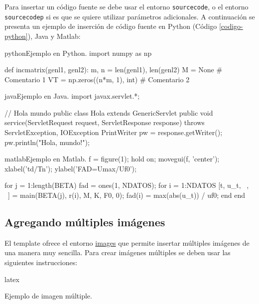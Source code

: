 	Para insertar un código fuente se debe usar el entorno \texttt{sourcecode}, o el entorno \texttt{sourcecodep} si es que se quiere utilizar parámetros adicionales. A continuación se presenta un ejemplo de inserción de código fuente en Python (Código \ref{codigo-python}), Java y Matlab:

\begin{sourcecode}[\label{codigo-python}]{python}{Ejemplo en Python.}
import numpy as np

def incmatrix(genl1, genl2):
	m, n = len(genl1), len(genl2)
	M = None # Comentario 1
	VT = np.zeros((n*m, 1), int) # Comentario 2
\end{sourcecode}

\begin{sourcecode}[]{java}{Ejemplo en Java.}
import javax.servlet.*;

// Hola mundo
public class Hola extends GenericServlet {
	public void service(ServletRequest request, ServletResponse response)
	throws ServletException, IOException{
		PrintWriter pw = response.getWriter();
		pw.println("Hola, mundo!");
	}
}
\end{sourcecode}

\begin{sourcecode}{matlab}{Ejemplo en Matlab.}
f = figure(1); hold on; movegui(f, 'center');
xlabel('td/Tn'); ylabel('FAD=Umax/Uf0');

for j = 1:length(BETA)
	fad = ones(1, NDATOS); %
	for i = 1:NDATOS
		[t, u_t, ~, ~] = main(BETA(j), r(i), M, K, F0, 0);
		fad(i) = max(abs(u_t)) / uf0;
	end
end
\end{sourcecode}

\subsection{Agregando múltiples imágenes}

	El template ofrece el entorno \href{https://latex.ppizarror.com/informe#hlp-images}{images} que permite insertar múltiples imágenes de una manera muy sencilla. Para crear imágenes múltiples se deben usar las siguientes instrucciones:

\begin{sourcecode}{latex}{}
\begin{images}[\label{imagenmultiple}]{Ejemplo de imagen múltiple.}
	\imagesnewline
\end{images}
\end{sourcecode}

